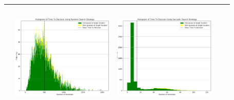\begin{landscape}
\begin{table}[h!]
\begin{tabular}{ | c | c | c | c | c |}
\begin{minipage}[c][58mm][c]{49mm}
    \end{minipage}
    &
    \begin{minipage}[c][58mm][c]{49mm}
      \includegraphics[width=49mm, height=52mm]{Chapters/MultiAgentTargetDetection/Figs/Histograms/VaryingPrior/Gaussian/GaussianRandomHistogram.png}
    \end{minipage}
    &
    \begin{minipage}[c][58mm][c]{49mm}
      \includegraphics[width=49mm, height=52mm]{Chapters/MultiAgentTargetDetection/Figs/Histograms/VaryingPrior/Gaussian/GaussianSaccadicHistogram.png}
    \end{minipage}
    \\
    \hline


\end{tabular}
\end{table}
\end{landscape}
